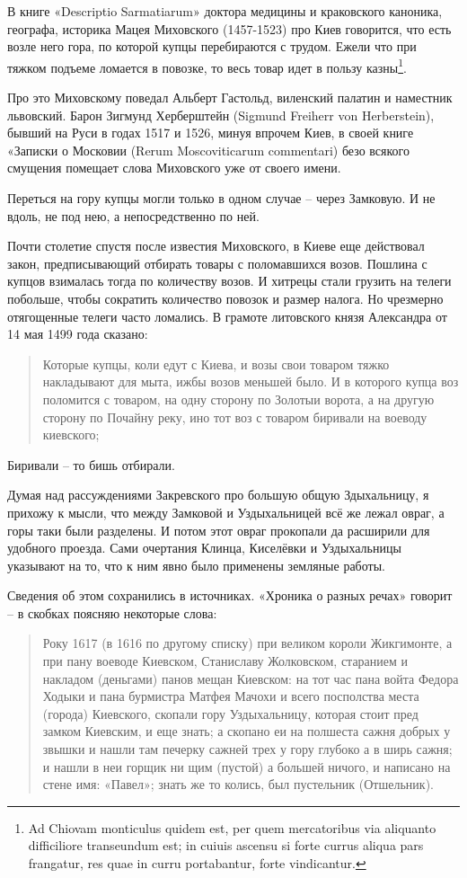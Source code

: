 В книге «Descriptio Sarmatiarum» доктора медицины и краковского каноника, географа, историка Мацея Миховского (1457-1523) про Киев говорится, что есть возле него гора, по которой купцы перебираются с трудом. Ежели что при тяжком подъеме ломается в повозке, то весь товар идет в пользу казны\footnote{Ad Chiovam monticulus quidem est, per quem mercatoribus via aliquanto difficiliore transeundum est; in cuiuis ascensu si forte currus aliqua pars frangatur, res quae in curru portabantur, forte vindicantur.}. 

Про это Миховскому поведал Альберт Гастольд, виленский палатин и наместник львовский. Барон Зигмунд Херберштейн (Sigmund Freiherr von Herberstein), бывший на Руси в годах 1517 и 1526, минуя впрочем Киев, в своей книге «Записки о Московии (Rerum Moscoviticarum commentari) безо всякого смущения помещает слова Миховского уже от своего имени.

Переться на гору купцы могли только в одном случае – через Замковую. И не вдоль, не под нею, а непосредственно по ней.

Почти столетие спустя после известия Миховского, в Киеве еще действовал закон, предписывающий отбирать товары с поломавшихся возов. Пошлина с купцов взималась тогда по количеству возов. И хитрецы стали грузить на телеги побольше, чтобы сократить количество повозок и размер налога. Но чрезмерно отягощенные телеги часто ломались. В грамоте литовского князя Александра от 14 мая 1499 года сказано:

\begin{quote}
Которые купцы, коли едут с Киева, и возы свои товаром тяжко накладывают для мыта, ижбы возов меньшей было. И в которого купца воз поломится с товаром, на одну сторону по Золотыи ворота, а на другую сторону по Почайну реку, ино тот воз с товаром биривали на воеводу киевского;
\end{quote}

Биривали – то бишь отбирали.

Думая над рассуждениями Закревского про большую общую Здыхальницу, я прихожу к мысли, что между Замковой и Уздыхальницей всё же лежал овраг, а горы таки были разделены. И потом этот овраг прокопали да расширили для удобного проезда. Сами очертания Клинца, Киселёвки и Уздыхальницы указывают на то, что к ним явно было применены земляные работы.

Сведения об этом сохранились в источниках. «Хроника о разных речах»\cite[стр. 85]{sbornikletug} говорит – в скобках поясняю некоторые слова:

\begin{quotation}
Року 1617 (в 1616 по другому списку) при великом короли Жикгимонте, а при пану воеводе Киевском, Станиславу Жолковском, старанием и накладом (деньгами) панов мещан Киевском: на тот час пана войта Федора Ходыки и пана бурмистра Матфея Мачохи и всего посполства места (города) Киевского, скопали гору Уздыхальницу, которая стоит пред замком Киевским, и еще знать; а скопано еи на полшеста сажня добрых у звышки и нашли там печерку сажней трех у гору глубоко а в ширь сажня; и нашли в неи горщик ни щим (пустой) а большей ничого, и написано на стене имя: «Павел»; знать же то колись, был пустельник (Отшельник).
\end{quotation}

